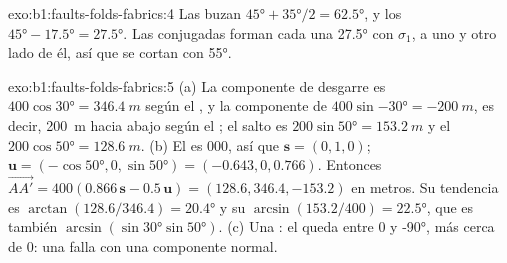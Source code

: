 \begin{solution}{exo:b1:faults-folds-fabrics:4}
Las  buzan $\ang{45} + \ang{35}/2 = \ang{62.5}$, y los 
$\ang{45} - \ang{17.5} = \ang{27.5}$. Las  conjugadas forman cada una
\ang{27.5} con $\sigma_1$, a uno y otro lado de él, así que se cortan con \ang{55}.
\end{solution}

\begin{solution}{exo:b1:faults-folds-fabrics:5}
(a) La componente de desgarre es $400\cos\ang{30} = \qty{346.4}{m}$ según el , y la componente de 
$400\sin\ang{-30} = \qty{-200}{m}$, es decir, \qty{200}{m} hacia abajo según el ; el salto es $200\sin\ang{50} = \qty{153.2}{m}$ y
el  $200\cos\ang{50} = \qty{128.6}{m}$. (b) El  es $000$, así que $\mathbf s = (0, 1, 0)$;
$\mathbf u = (-\cos\ang{50}, 0, \sin\ang{50}) =
(-0.643, 0, 0.766)$. Entonces
$\overrightarrow{AA'} = 400(0.866\,\mathbf s - 0.5\,\mathbf u) =
(128.6, 346.4, -153.2)$ en metros. Su tendencia es $\arctan(128.6/346.4) =
\ang{20.4}$ y su  $\arcsin(153.2/400) = \ang{22.5}$, que es también
$\arcsin(\sin\ang{30}\sin\ang{50})$. (c) Una : el  queda
entre $0$ y \ang{-90}, más cerca de $0$: una falla  con una
componente normal.
\end{solution}

